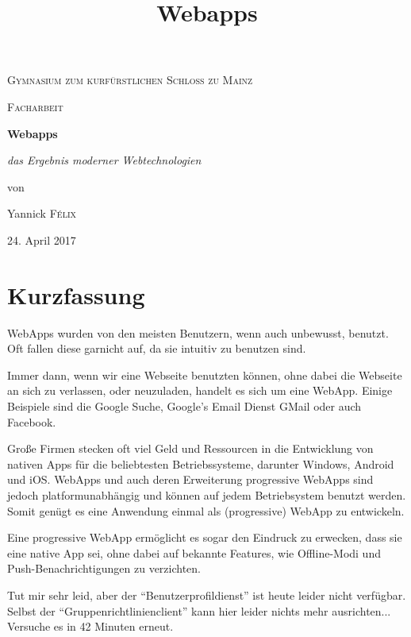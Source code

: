 \documentclass[a4paper,12pt,ngerman]{scrartcl}      %
\title{Webapps}  %
\begin{document}
	
	\begin{titlepage}
		\centering
		{\scshape\LARGE Gymnasium zum kurf\"{u}rstlichen Schloss zu Mainz \par}
		\vspace{1cm}
		{\scshape\Large Facharbeit\par}
		\vspace{2.5cm}
		{\huge\bfseries Webapps\par}
		\vspace{1cm}
		{\Large\itshape das Ergebnis moderner Webtechnologien\par}
		\vfill
		von\par
		Yannick \textsc{F\'elix}
		
		\vfill
		
		{\large 24. April 2017 \par}
		\newpage
	\end{titlepage}
	
	\setcounter{page}{1}
	\section{Kurzfassung}
	WebApps wurden von den meisten Benutzern, wenn auch unbewusst, benutzt. Oft fallen diese garnicht auf, da sie intuitiv zu benutzen sind.\par
	Immer dann, wenn wir eine Webseite benutzten können, ohne dabei die Webseite an sich zu verlassen, oder neuzuladen, handelt es sich um eine WebApp. Einige Beispiele sind die Google Suche, Google's Email Dienst GMail oder auch Facebook.\par
	Große Firmen stecken oft viel Geld und Ressourcen in die Entwicklung von nativen Apps für die beliebtesten Betriebssysteme, darunter Windows, Android und iOS. WebApps und auch deren Erweiterung progressive WebApps sind jedoch platformunabhängig und können auf jedem Betriebsystem benutzt werden. Somit genügt es eine Anwendung einmal als (progressive) WebApp zu entwickeln.\par
	Eine progressive WebApp ermöglicht es sogar den Eindruck zu erwecken, dass sie eine native App sei, ohne dabei auf bekannte Features, wie Offline-Modi und Push-Benachrichtigungen zu verzichten.\par
	Tut mir sehr leid, aber der ``Benutzerprofildienst'' ist heute leider nicht verfügbar.
	Selbst der ``Gruppenrichtlinienclient'' kann hier leider nichts mehr ausrichten...
	Versuche es in 42 Minuten erneut.\par
\end{document}
